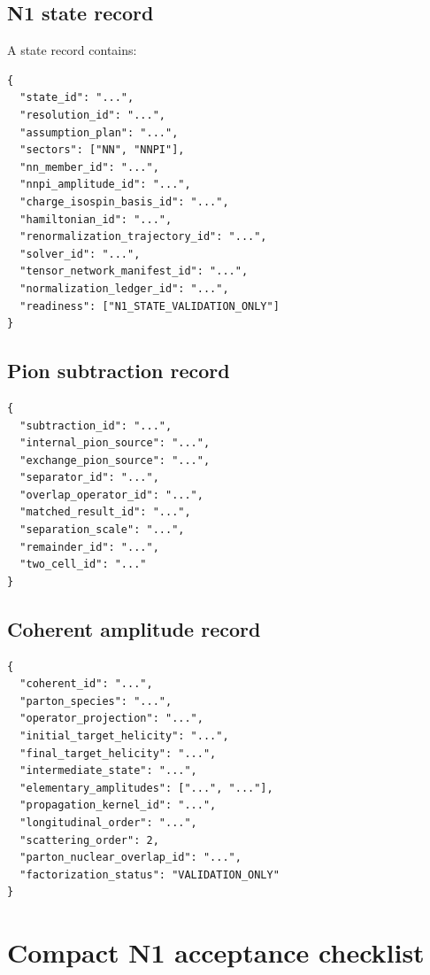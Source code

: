 \documentclass[11pt]{article}
\begin{document}
\subsection{N1 state record}

A state record contains:
\begin{verbatim}
{
  "state_id": "...",
  "resolution_id": "...",
  "assumption_plan": "...",
  "sectors": ["NN", "NNPI"],
  "nn_member_id": "...",
  "nnpi_amplitude_id": "...",
  "charge_isospin_basis_id": "...",
  "hamiltonian_id": "...",
  "renormalization_trajectory_id": "...",
  "solver_id": "...",
  "tensor_network_manifest_id": "...",
  "normalization_ledger_id": "...",
  "readiness": ["N1_STATE_VALIDATION_ONLY"]
}
\end{verbatim}

\subsection{Pion subtraction record}

\begin{verbatim}
{
  "subtraction_id": "...",
  "internal_pion_source": "...",
  "exchange_pion_source": "...",
  "separator_id": "...",
  "overlap_operator_id": "...",
  "matched_result_id": "...",
  "separation_scale": "...",
  "remainder_id": "...",
  "two_cell_id": "..."
}
\end{verbatim}

\subsection{Coherent amplitude record}

\begin{verbatim}
{
  "coherent_id": "...",
  "parton_species": "...",
  "operator_projection": "...",
  "initial_target_helicity": "...",
  "final_target_helicity": "...",
  "intermediate_state": "...",
  "elementary_amplitudes": ["...", "..."],
  "propagation_kernel_id": "...",
  "longitudinal_order": "...",
  "scattering_order": 2,
  "parton_nuclear_overlap_id": "...",
  "factorization_status": "VALIDATION_ONLY"
}
\end{verbatim}

\section{Compact N1 acceptance checklist}
\end{document}
